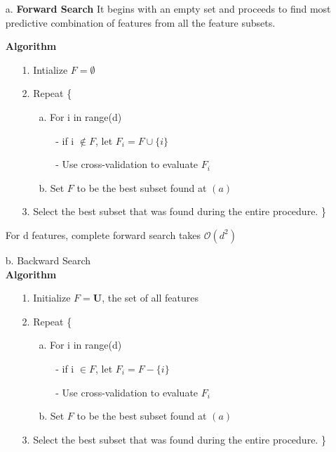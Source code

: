 \documentclass[12pt,a4paper,titlepage,landscape]{book}
\begin{document}
	\begin{enumerate}
		\item[a.] \textbf{Forward Search}
		It begins with an empty set and proceeds to find most predictive combination of features from all the feature subsets.
		
		\textbf{Algorithm}
		\begin{enumerate}
			\item[1.] Intialize $F = \emptyset$
			\item[2.] Repeat \{
			\begin{enumerate}
				\item[a.] For i in range(d)
				\begin{enumerate}
					\item[-] if i $\notin F$, let $F_i=F\cup\{i\}$
					\item[-] Use cross-validation to evaluate $F_i$
				\end{enumerate}
				\item[b.] Set $F$ to be the best subset found at $(a)$
			\end{enumerate}
			\item[3.] Select the best subset that was found during the entire procedure.
		\} 
		\end{enumerate}
	For d features, complete forward search takes $\mathcal{O}(d^2)$\\
		\item[b.] Backward Search \\
		\textbf{Algorithm}
		\begin{enumerate}
			\item[1.] Initialize $F = \mathbf{U} $, the set of all features
			\item[2.] Repeat \{
			\begin{enumerate}
				\item[a.] For i in range(d)
				\begin{enumerate}
					\item[-] if i $\in F$, let $F_i=F - \{i\}$
					\item[-] Use cross-validation to evaluate $F_i$
				\end{enumerate}
				\item[b.] Set $F$ to be the best subset found at $(a)$
			\end{enumerate}
			\item[3.] Select the best subset that was found during the entire procedure.
			\}
		\end{enumerate}
	\end{enumerate}
\end{document}
